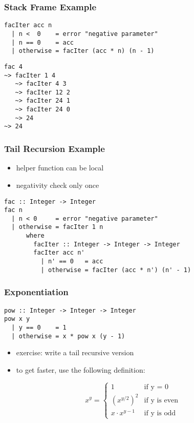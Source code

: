 \documentclass[dvipsnames]{beamer}
\theoremstyle{plain}
\begin{document}
\begin{frame}[fragile]
  \frametitle{Stack Frame Example}

  \begin{exampleblock}{}
  \begin{lstlisting}
facIter acc n
  | n <  0    = error "negative parameter"
  | n == 0    = acc
  | otherwise = facIter (acc * n) (n - 1)
  \end{lstlisting}

    \begin{lstlisting}[frame=single]
fac 4
~> facIter 1 4
   ~> facIter 4 3
   ~> facIter 12 2
   ~> facIter 24 1
   ~> facIter 24 0
   ~> 24
~> 24
    \end{lstlisting}
  \end{exampleblock}
\end{frame}

\begin{frame}[fragile]
  \frametitle{Tail Recursion Example}

  \begin{itemize}
    \item helper function can be local
    \item negativity check only once
  \end{itemize}

  \begin{lstlisting}
fac :: Integer -> Integer
fac n
  | n < 0     = error "negative parameter"
  | otherwise = facIter 1 n
      where
        facIter :: Integer -> Integer -> Integer
        facIter acc n'
          | n' == 0   = acc
          | otherwise = facIter (acc * n') (n' - 1)
  \end{lstlisting}
\end{frame}

\begin{frame}[fragile]
  \frametitle{Exponentiation}

  \begin{lstlisting}
pow :: Integer -> Integer -> Integer
pow x y
  | y == 0    = 1
  | otherwise = x * pow x (y - 1)
  \end{lstlisting}

  \pause
  \begin{itemize}
    \item exercise: write a tail recursive version
  \end{itemize}

  \pause
  \begin{itemize}
    \item to get faster, use the following definition:
  \end{itemize}
  \[
    x^y =
      \begin{cases}
        1               & \mbox{if y = 0}\\
        {(x^{y/2})}^2   & \mbox{if y is even}\\
        x \cdot x^{y-1} & \mbox{if y is odd}
      \end{cases}
  \]
\end{frame}
\end{document}
